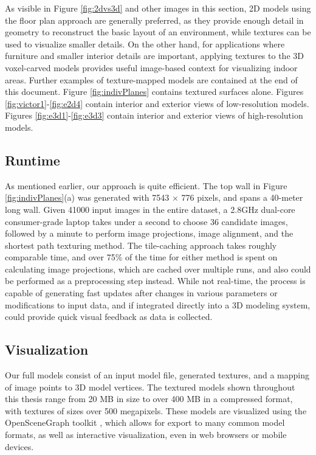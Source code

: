 \documentclass[]{spie}  %
\begin{document}
As visible in Figure \ref{fig:2dvs3d} and other images in this
section, 2D models using the floor plan approach are generally
preferred, as they provide enough detail in geometry to reconstruct
the basic layout of an environment, while textures can be used to
visualize smaller details. On the other hand, for applications where
furniture and smaller interior details are important, applying
textures to the 3D voxel-carved models provides useful image-based
context for visualizing indoor areas. Further examples of
texture-mapped models are contained at the end of this
document. Figure \ref{fig:indivPlanes} contains textured surfaces
alone. Figures \ref{fig:victor1}-\ref{fig:e2d4} contain interior and
exterior views of low-resolution models. Figures
\ref{fig:e3d1}-\ref{fig:e3d3} contain interior and exterior views of
high-resolution models.


\subsection{Runtime}
As mentioned earlier, our approach is quite efficient. The top wall in
Figure \ref{fig:indivPlanes}(a) was generated with 7543 $\times$ 776
pixels, and spans a 40-meter long wall. Given 41000 input images in
the entire dataset, a 2.8GHz dual-core consumer-grade laptop takes
under a second to choose 36 candidate images, followed by a minute to
perform image projections, image alignment, and the shortest path
texturing method. The tile-caching approach takes roughly comparable
time, and over 75\% of the time for either method is spent on
calculating image projections, which are cached over multiple runs,
and also could be performed as a preprocessing step instead. While not
real-time, the process is capable of generating fast updates after
changes in various parameters or modifications to input data, and if
integrated directly into a 3D modeling system, could provide quick
visual feedback as data is collected.


\subsection{Visualization}
Our full models consist of an input model file, generated textures,
and a mapping of image points to 3D model vertices. The textured
models shown throughout this thesis range from 20 MB in size to over
400 MB in a compressed format, with textures of sizes over 500
megapixels. These models are visualized using the OpenSceneGraph
toolkit \cite{openscenegraph}, which allows for export to many common
model formats, as well as interactive visualization, even in web
browsers or mobile devices.
\end{document}
